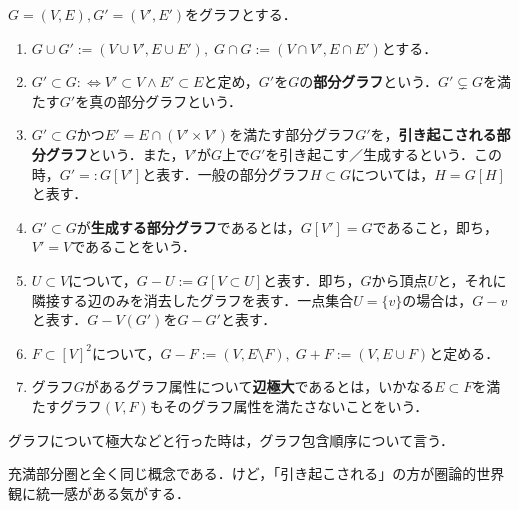 \documentclass[uplatex,dvipdfmx]{jsreport}
\begin{document}
\begin{definition}
    $G=(V,E),G'=(V',E')$をグラフとする．
    \begin{enumerate}
        \item $G\cup G':=(V\cup V',E\cup E'),\;G\cap G:=(V\cap V',E\cap E')$とする．
        \item $G'\subset G:\Leftrightarrow V'\subset V\land E'\subset E$と定め，$G'$を$G$の\textbf{部分グラフ}という．$G'\subsetneq G$を満たす$G'$を真の部分グラフという．
        \item $G'\subset G$かつ$E'=E\cap (V'\times V')$を満たす部分グラフ$G'$を，\textbf{引き起こされる部分グラフ}という．また，$V'$が$G$上で$G'$を引き起こす／生成するという．この時，$G'=:G[V']$と表す．一般の部分グラフ$H\subset G$については，$H=G[H]$と表す．
        \item $G'\subset G$が\textbf{生成する部分グラフ}であるとは，$G[V']=G$であること，即ち，$V'=V$であることをいう．
        \item $U\subset V$について，$G-U:=G[V\subset U]$と表す．即ち，$G$から頂点$U$と，それに隣接する辺のみを消去したグラフを表す．一点集合$U=\{v\}$の場合は，$G-v$と表す．$G-V(G')$を$G-G'$と表す．
        \item $F\subset[V]^2$について，$G-F:=(V,E\setminus F),\;G+F:=(V,E\cup F)$と定める．
        \item グラフ$G$があるグラフ属性について\textbf{辺極大}であるとは，いかなる$E\subset F$を満たすグラフ$(V,F)$もそのグラフ属性を満たさないことをいう．
    \end{enumerate}
\end{definition}
\begin{remark}
    グラフについて極大などと行った時は，グラフ包含順序について言う．
\end{remark}
\begin{remarks}
    充満部分圏と全く同じ概念である．けど，「引き起こされる」の方が圏論的世界観に統一感がある気がする．
\end{remarks}
\end{document}
